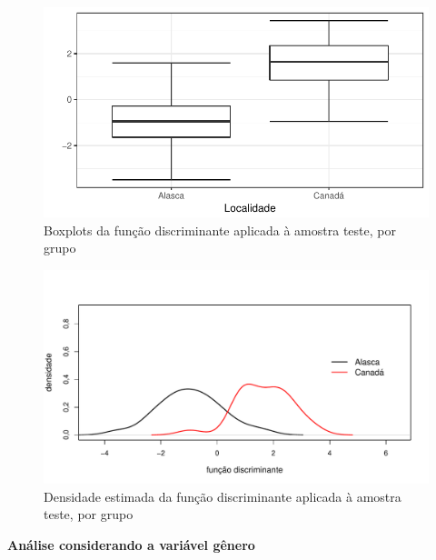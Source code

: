 \documentclass[10pt,portuguese,]{article}
\begin{document}
\vspace{1.0cm}

\begin{figure}[!h]

{\centering \includegraphics{RELATORIO_FINAL_FORMATADO_files/figure-latex/unnamed-chunk-22-1} 

}

\caption{Boxplots da função discriminante aplicada à amostra teste, por grupo}\label{fig:unnamed-chunk-22}
\end{figure}

\begin{figure}[!h]

{\centering \includegraphics{RELATORIO_FINAL_FORMATADO_files/figure-latex/unnamed-chunk-23-1} 

}

\caption{Densidade estimada da função discriminante aplicada à amostra teste, por grupo}\label{fig:unnamed-chunk-23}
\end{figure}

\newpage

\begin{center}
\textbf{Análise considerando a variável gênero}
\end{center}
\end{document}
